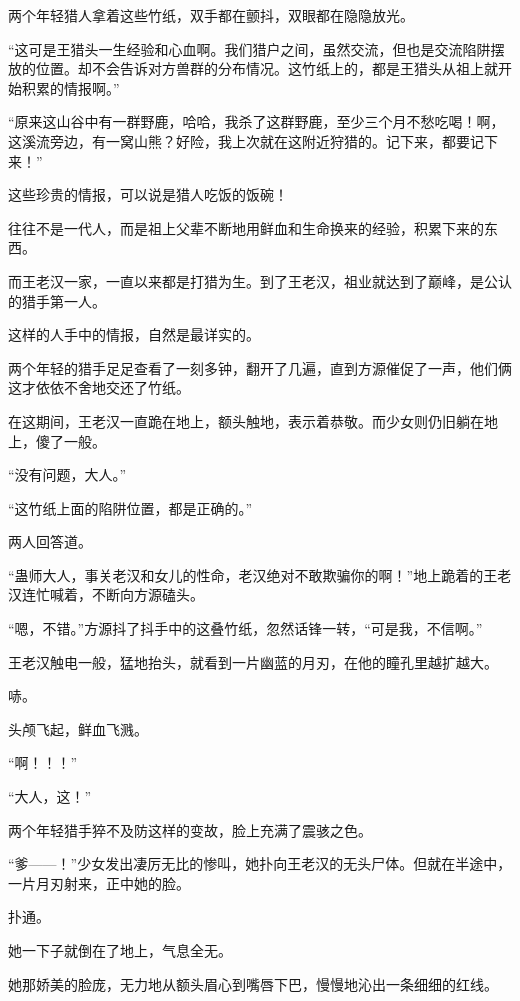
\begin{this_body}

两个年轻猎人拿着这些竹纸，双手都在颤抖，双眼都在隐隐放光。

“这可是王猎头一生经验和心血啊。我们猎户之间，虽然交流，但也是交流陷阱摆放的位置。却不会告诉对方兽群的分布情况。这竹纸上的，都是王猎头从祖上就开始积累的情报啊。”

“原来这山谷中有一群野鹿，哈哈，我杀了这群野鹿，至少三个月不愁吃喝！啊，这溪流旁边，有一窝山熊？好险，我上次就在这附近狩猎的。记下来，都要记下来！”

这些珍贵的情报，可以说是猎人吃饭的饭碗！

往往不是一代人，而是祖上父辈不断地用鲜血和生命换来的经验，积累下来的东西。

而王老汉一家，一直以来都是打猎为生。到了王老汉，祖业就达到了巅峰，是公认的猎手第一人。

这样的人手中的情报，自然是最详实的。

两个年轻的猎手足足查看了一刻多钟，翻开了几遍，直到方源催促了一声，他们俩这才依依不舍地交还了竹纸。

在这期间，王老汉一直跪在地上，额头触地，表示着恭敬。而少女则仍旧躺在地上，傻了一般。

“没有问题，大人。”

“这竹纸上面的陷阱位置，都是正确的。”

两人回答道。

“蛊师大人，事关老汉和女儿的性命，老汉绝对不敢欺骗你的啊！”地上跪着的王老汉连忙喊着，不断向方源磕头。

“嗯，不错。”方源抖了抖手中的这叠竹纸，忽然话锋一转，“可是我，不信啊。”

王老汉触电一般，猛地抬头，就看到一片幽蓝的月刃，在他的瞳孔里越扩越大。

哧。

头颅飞起，鲜血飞溅。

“啊！！！”

“大人，这！”

两个年轻猎手猝不及防这样的变故，脸上充满了震骇之色。

“爹——！”少女发出凄厉无比的惨叫，她扑向王老汉的无头尸体。但就在半途中，一片月刃射来，正中她的脸。

扑通。

她一下子就倒在了地上，气息全无。

她那娇美的脸庞，无力地从额头眉心到嘴唇下巴，慢慢地沁出一条细细的红线。


\end{this_body}
